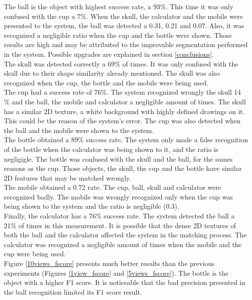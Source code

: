 	The ball is the object with highest success rate, a 93\%. 
	This time it was only confused with the cup a 7\%. 
	When the skull, the calculator and the mobile were presented to the system, the ball was detected a 0.31, 0.21 and 0.07. 
	Also, it was recognized a negligible ratio when the cup and the bottle were shown. 
	Those results are high and may be attributed to the improvable segmentation performed in the system. 
	Possible upgrades are explained in section \ref{conclusions}.
	\\
	
	The skull was detected correctly a 69\% of times. 
	It was only confused with the skull due to their shape similarity already mentioned.
	The skull was also recognized when the cup, the bottle and the mobile were being used. 
	\\
	The cup had a success rate of 76\%. 
	The system recognized wrongly the skull 14 \% and the ball, the mobile and calculator a negligible amount of times. 
	The skull has a similar 2D texture, a white background with highly defined drawings on it. 
	This could be the reason of the system's error. 
	The cup was also detected when the ball and the mobile were shown to the system. 
	\\

	The bottle obtained a 89\% success rate. 
	The system only made a false recognition of the bottle when the calculator was being shown to it, and the ratio is negligigle. 
	The bottle was confused with the skull and the ball, for the sames reasons as the cup. 
	Those objects, the skull, the cup and the bottle have similar 2D features that may be matched wrongly. 
	\\
	The mobile obtained a 0.72 rate. 
	The cup, ball, skull and calculator were recognized badly. 
	The mobile was wrongly recognized only when the cup was being shown to the system and the ratio is negligible (0.3). 
	\\
	Finally, the calculator has a 76\% success rate. 
	The system detected the ball a 21\% of times in this measurement. 
	It is possible that the dense 2D textures of both the ball and the calculator affected the system in the matching process. 
	The calculator was recognized a negligible amount of times when the mobile and the cup were being used. 
	\\

	Figure \ref{10views_fscore} presents much better results than the previous experiments (Figures \ref{1view_fscore} and \ref{5views_fscore}).
	The bottle is the object with a higher F1 score. 
	It is noticeable that the bad precision presented in the ball recognition limited its F1 score result. 


